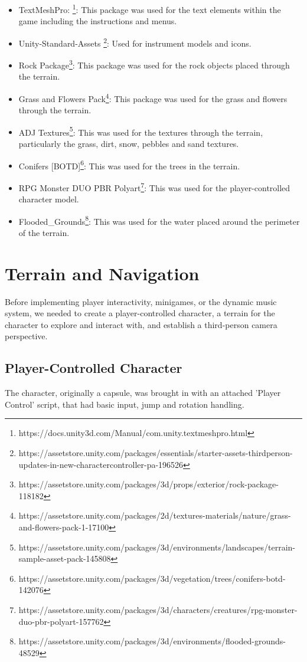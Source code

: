 \documentclass{l4proj}
\begin{document}
\begin{itemize}
    \item TextMeshPro: \footnote{https://docs.unity3d.com/Manual/com.unity.textmeshpro.html}: This package was used for the text elements within the game including the instructions and menus.
    \item Unity-Standard-Assets \footnote{https://assetstore.unity.com/packages/essentials/starter-assets-thirdperson-updates-in-new-charactercontroller-pa-196526}: Used for instrument models and icons.
    \item Rock Package\footnote{https://assetstore.unity.com/packages/3d/props/exterior/rock-package-118182}: This package was used for the rock objects placed through the terrain.
    \item Grass and Flowers Pack\footnote{https://assetstore.unity.com/packages/2d/textures-materials/nature/grass-and-flowers-pack-1-17100}: This package was used for the grass and flowers through the terrain.
    \item ADJ Textures\footnote{https://assetstore.unity.com/packages/3d/environments/landscapes/terrain-sample-asset-pack-145808}: This was used for the textures through the terrain, particularly the grass, dirt, snow, pebbles and sand textures.
    \item Conifers [BOTD]\footnote{https://assetstore.unity.com/packages/3d/vegetation/trees/conifers-botd-142076}: This was used for the trees in the terrain.
    \item RPG Monster DUO PBR Polyart\footnote{https://assetstore.unity.com/packages/3d/characters/creatures/rpg-monster-duo-pbr-polyart-157762}: This was used for the player-controlled character model.
    \item Flooded\_Grounds\footnote{https://assetstore.unity.com/packages/3d/environments/flooded-grounds-48529}: This was used for the water placed around the perimeter of the terrain.
\end{itemize}

\section{Terrain and Navigation}
Before implementing player interactivity, minigames, or the dynamic music system, we needed to create a player-controlled character, a terrain for the character to explore and interact with, and establish a third-person camera perspective.

\subsection{Player-Controlled Character}\label{sec:player_script}
The character, originally a capsule, was brought in with an attached 'Player Control' script, that had basic input, jump and rotation handling.
\end{document}

